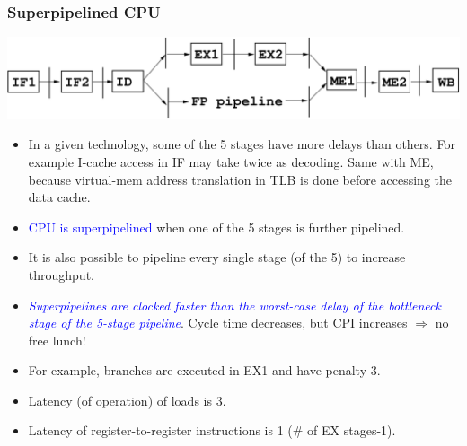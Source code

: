 \documentclass{beamer}
\newcommand{\blue}[1]{\textcolor{Blue}{{#1}}}
\renewcommand{\emph}[1]{\textcolor{structure}{#1}}
\newcommand{\emp}[1]{\textcolor{DikuRed}{ #1}}
\begin{document}
\begin{frame}[fragile,t]
\frametitle{Superpipelined CPU}

\includegraphics[width=59ex]{Figures/SuperPipeline}

\pause\bigskip

\begin{scriptsize}
\begin{itemize}
\item In a given technology, some of the 5 stages have more delays than others.
        For example I-cache access in IF may take twice as decoding.
        Same with ME, because virtual-mem address translation in TLB is 
        done before accessing the data cache.\smallskip

\item \blue{CPU is superpipelined} when one of the 5 stages is further pipelined.\smallskip

\item It is also possible to pipeline every single stage (of the 5) to increase
            throughput.\bigskip

\item \blue{\em Superpipelines are clocked faster than the worst-case delay 
            of the bottleneck stage of the 5-stage pipeline}.
        \emph{Cycle time decreases,} \emp{but CPI increases} 
        $\Rightarrow$ no free lunch!\bigskip

\item For example, branches are executed in EX1 and have penalty 3.
\item Latency (of operation) of loads is 3.
\item Latency of register-to-register instructions is 1 (\# of EX stages-1).
\end{itemize}
\end{scriptsize}
\end{frame}
\end{document}
